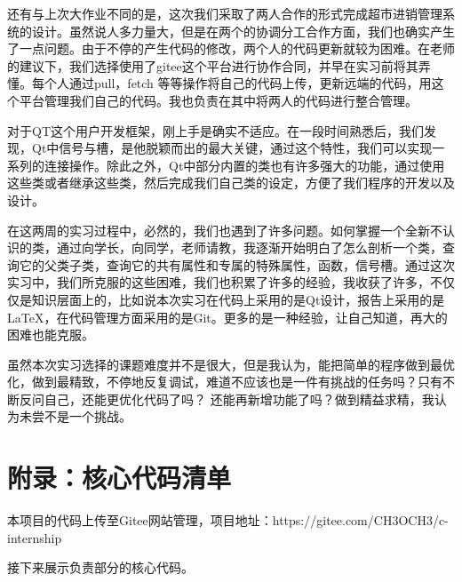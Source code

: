 \documentclass[
   projtype=report, %
   output=print,     %
  ]{nwafuprojrep}
\begin{document}
还有与上次大作业不同的是，这次我们采取了两人合作的形式完成超市进销管理系统的设计。虽然说人多力量大，但是在两个的协调分工合作方面，我们也确实产生了一点问题。由于不停的产生代码的修改，两个人的代码更新就较为困难。在老师的建议下，我们选择使用了gitee这个平台进行协作合同，并早在实习前将其弄懂。每个人通过pull，fetch 等等操作将自己的代码上传，更新远端的代码，用这个平台管理我们自己的代码。我也负责在其中将两人的代码进行整合管理。

对于QT这个\ccpp 用户开发框架，刚上手是确实不适应。在一段时间熟悉后，我们发现，Qt中信号与槽，是他脱颖而出的最大关键，通过这个特性，我们可以实现一系列的连接操作。除此之外，Qt中部分内置的类也有许多强大的功能，通过使用这些类或者继承这些类，然后完成我们自己类的设定，方便了我们程序的开发以及设计。

在这两周的实习过程中，必然的，我们也遇到了许多问题。如何掌握一个全新不认识的类，通过向学长，向同学，老师请教，我逐渐开始明白了怎么剖析一个类，查询它的父类子类，查询它的共有属性和专属的特殊属性，函数，信号槽。通过这次实习中，我们所克服的这些困难，我们也积累了许多的经验，我收获了许多，不仅仅是知识层面上的，比如说本次实习在代码上采用的是Qt设计，报告上采用的是\LaTeX ，在代码管理方面采用的是Git。更多的是一种经验，让自己知道，再大的困难也能克服。

虽然本次实习选择的课题难度并不是很大，但是我认为，能把简单的程序做到最优化，做到最精致，不停地反复调试，难道不应该也是一件有挑战的任务吗？只有不断反问自己，还能更优化代码了吗？
还能再新增功能了吗？做到精益求精，我认为未尝不是一个挑战。
\section{附录：核心代码清单}
本项目的代码上传至Gitee网站管理，项目地址：https://gitee.com/CH3OCH3/c-internship

接下来展示负责部分的核心代码。
\end{document}
